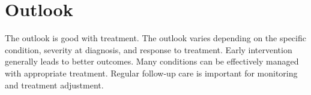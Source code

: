 \section{Outlook}
The outlook is good with treatment. The outlook varies depending on the specific condition, severity at diagnosis, and response to treatment. Early intervention generally leads to better outcomes. Many conditions can be effectively managed with appropriate treatment. Regular follow-up care is important for monitoring and treatment adjustment.
